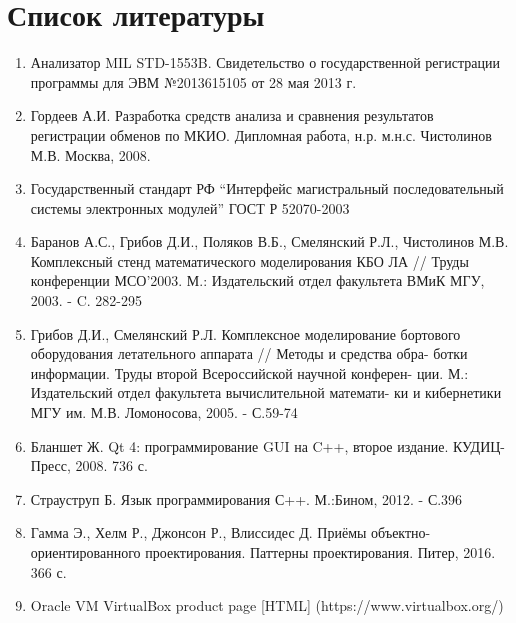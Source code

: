 \section*{Список литературы}

\begin{enumerate}
 \sloppy
 \item \label{opermon_reg} Анализатор MIL STD-1553B. Свидетельство о 
государственной регистрации программы для ЭВМ №2013615105 от 28 мая 2013 г.
 \item \label{gordeev_diploma} Гордеев А.И. Разработка средств анализа и 
сравнения результатов регистрации обменов по МКИО. Дипломная работа, н.р. 
м.н.с. Чистолинов М.В. Москва, 2008.
 \item \label{gost_r_52070-2003} Государственный стандарт РФ ``Интерфейс 
магистральный последовательный системы электронных модулей'' ГОСТ Р 52070-2003
 \item \label{stand} Баранов А.С., Грибов Д.И., Поляков В.Б., Смелянский Р.Л., 
Чистолинов М.В. Комплексный стенд математического моделирования
КБО ЛА // Труды конференции МСО'2003. М.: Издательский отдел
факультета ВМиК МГУ, 2003. - C. 282-295
 \item \label{stand2} Грибов Д.И., Смелянский Р.Л. Комплексное моделирование 
бортового оборудования летательного аппарата // Методы и средства обра-
ботки информации. Труды второй Всероссийской научной конферен-
ции. М.: Издательский отдел факультета вычислительной математи-
ки и кибернетики МГУ им. М.В. Ломоносова, 2005. - С.59-74 
 \item \label{blanshet_qt4} Бланшет Ж. Qt 4: программирование GUI на C++, 
второе издание. КУДИЦ-Пресс, 2008. 736 с.
 \item \label{straustrup} Страуструп Б. Язык программирования С++. М.:Бином, 
2012. - С.396
 \item \label{gof} Гамма Э., Хелм Р., Джонсон Р., Влиссидес Д. Приёмы 
объектно-ориентированного проектирования. Паттерны проектирования. Питер, 2016. 
366 с.
 \item \label{virtualbox} Oracle VM VirtualBox product page [HTML] 
(https://www.virtualbox.org/)
\end{enumerate}
